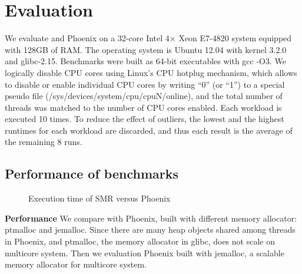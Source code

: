 \section{Evaluation}
We evaluate \myds and Phoenix on 
a 32-core Intel 4× Xeon E7-4820 system equipped with 128GB of RAM. 
The operating system is Ubuntu 12.04 with kernel 3.2.0 and glibc-2.15.
Benchmarks were built as 64-bit executables with gcc -O3.
We logically disable CPU cores using Linux’s CPU hotplug mechanism, 
which allows to disable or enable individual CPU cores 
by writing “0” (or “1”) to 
a special pseudo file (/sys/devices/system/cpu/cpuN/online), 
and the total number of threads was matched to the number of CPU cores enabled.
Each workload is executed 10 times. 
To reduce the effect of outliers, 
the lowest and the highest runtimes for each workload are discarded, 
and thus each result is the average of the remaining 8 runs.

\subsection{Performance of benchmarks}

\begin{figure}[htpb]
\centering
  \caption{Execution time of SMR versus Phoenix}
   \label{fig:time}
\end{figure}

{\bf Performance}
We compare \myds with Phoenix, built with different memory allocator: ptmalloc and jemalloc.
Since there are many heap objects shared among threads
in Phoenix, and ptmalloc\cite{gloger1997ptmalloc}, 
the memory allocator in glibc, does not scale on multicore system. 
Then we evaluation Phoenix built with jemalloc\cite{evans2006jemalloc}, 
a scalable memory allocator for multicore system.

